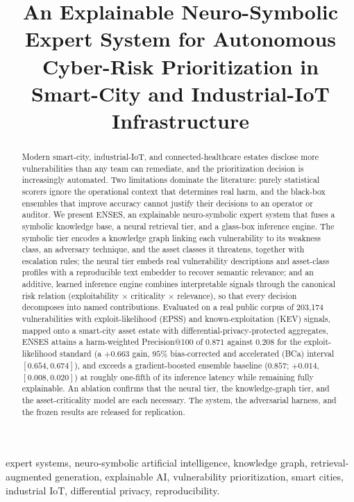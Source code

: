 \documentclass[journal]{IEEEtran}
\title{An Explainable Neuro-Symbolic Expert System for Autonomous Cyber-Risk
Prioritization in Smart-City and Industrial-IoT Infrastructure}
\author{%
  \IEEEauthorblockN{Harshavardhan Malla}
  \IEEEauthorblockA{Independent Researcher\\
  Email: harshavardhanmalla75@gmail.com}%
}
\begin{document}
\maketitle

\begin{abstract}
Modern smart-city, industrial-IoT, and connected-healthcare estates disclose
more vulnerabilities than any team can remediate, and the prioritization
decision is increasingly automated. Two limitations dominate the literature:
purely statistical scorers ignore the operational context that determines real
harm, and the black-box ensembles that improve accuracy cannot justify their
decisions to an operator or auditor. We present ENSES, an explainable
neuro-symbolic expert system that fuses a symbolic knowledge base, a neural
retrieval tier, and a glass-box inference engine. The symbolic tier encodes a
knowledge graph linking each vulnerability to its weakness class, an adversary
technique, and the asset classes it threatens, together with escalation rules;
the neural tier embeds real vulnerability descriptions and asset-class profiles
with a reproducible text embedder to recover semantic relevance; and an
additive, learned inference engine combines interpretable signals through the
canonical risk relation (exploitability $\times$ criticality $\times$ relevance),
so that every decision decomposes into named contributions. Evaluated on a real
public corpus of 203{,}174 vulnerabilities with exploit-likelihood (EPSS) and
known-exploitation (KEV) signals, mapped onto a smart-city asset estate with
differential-privacy-protected aggregates, ENSES attains a harm-weighted
Precision@100 of $0.871$ against $0.208$ for the exploit-likelihood standard
(a $+0.663$ gain, $95\%$ bias-corrected and accelerated (BCa) interval
$[0.654,0.674]$), and exceeds a gradient-boosted ensemble baseline ($0.857$;
$+0.014$, $[0.008,0.020]$) at roughly one-fifth of its inference latency while
remaining fully explainable. An ablation confirms that the neural tier, the
knowledge-graph tier, and the asset-criticality model are each necessary. The
system, the adversarial harness, and the frozen results are released for
replication.
\end{abstract}

\begin{IEEEkeywords}
expert systems, neuro-symbolic artificial intelligence, knowledge graph,
retrieval-augmented generation, explainable AI, vulnerability prioritization,
smart cities, industrial IoT, differential privacy, reproducibility.
\end{IEEEkeywords}
\end{document}
